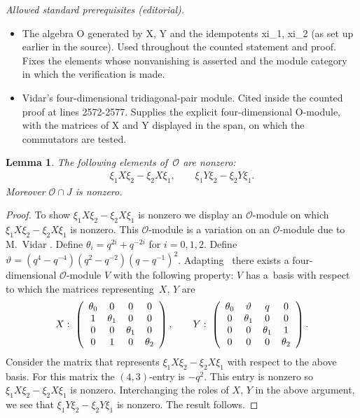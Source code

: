 \documentclass[10pt,a4paper]{amsart}
\newtheorem{Lemma}[Theorem]{Lemma}
\begin{document}
\noindent\textit{Allowed standard prerequisites (editorial).}\begin{itemize}
\item The algebra O generated by X, Y and the idempotents xi\_1, xi\_2 (as set up earlier in the source). Used throughout the counted statement and proof. Fixes the elements whose nonvanishing is asserted and the module category in which the verification is made.
\item Vidar's four-dimensional tridiagonal-pair module. Cited inside the counted proof at lines 2572-2577. Supplies the explicit four-dimensional O-module, with the matrices of X and Y displayed in the span, on which the commutators are tested.
\end{itemize}\medskip
\begin{Lemma}
\label{lem:nonz}
The following  elements of~$\mathcal O$ are nonzero:
\begin{gather*}
\xi_1 X \xi_2-\xi_2 X \xi_1,
\qquad
\xi_1 Y \xi_2-\xi_2 Y \xi_1.
\end{gather*}
Moreover
${\mathcal O} \cap J$ is nonzero.
\end{Lemma}

\begin{proof}
To show $\xi_1 X \xi_2-\xi_2 X \xi_1$ is nonzero
we display an $\mathcal O$-module
on which
$\xi_1 X \xi_2-\xi_2 X \xi_1$ is nonzero.
This $\mathcal O$-module is a variation on an $\mathcal O$-module
due to M.~Vidar
\cite[Theorem 9.1]{Vidar}.
Def\/ine $\theta_i = q^{2i}+q^{-2i}$
for $i=0,1,2$. Def\/ine $\vartheta = (q^4-q^{-4})(q^2-q^{-2})(q-q^{-1})^2$.
Adapting~\cite[Theorem 9.1]{Vidar}
there exists a four-dimensional $\mathcal O$-module $V$
with the following property: $V$ has a~basis with respect to
which the matrices representing~$X$, $Y$ are
\begin{gather*}
X:\;
\left(
\begin{array}{ c c c c}
\theta_0 & 0 & 0 & 0   \\
1 & \theta_1 & 0 & 0  \\
0 & 0 & \theta_1  & 0 \\
0 & 1 & 0  & \theta_2
\end{array}
\right),
\qquad
Y:\;
\left(
\begin{array}{ c c c c}
\theta_0 & \vartheta & q & 0   \\
0 & \theta_1 & 0 & 0  \\
0 & 0 & \theta_1  & 1 \\
0 & 0 & 0  & \theta_2
\end{array}
\right).
\end{gather*}
Consider the matrix that represents
$\xi_1X\xi_2-\xi_2 X \xi_1 $ with respect to the above basis.
For this matrix the $(4,3)$-entry is $-q^2$.
This entry is nonzero
so
$\xi_1 X \xi_2- \xi_2 X \xi_1$ is nonzero.
Interchanging the roles of $X$, $Y$ in the above argument,
we see that
 $\xi_1 Y \xi_2- \xi_2 Y \xi_1$ is
nonzero.
The result follows.
\end{proof}
\end{document}
